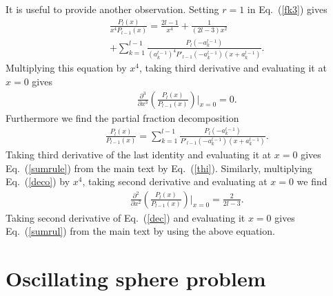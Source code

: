 \documentclass[aps,prx,twocolumn,amsmath,amssymb,amsfonts]{revtex4-2}
\begin{document}
{{\begin{appendices}
It is useful to provide another observation. Setting $r=1$ in Eq.~(\ref{fk3}) gives
\begin{eqnarray}&&
\frac{P_{l}(x)}{x^{4} P_{l-1}(x)}\!=\!\frac{2l\!-\!1}{x^4}\!+\!\frac{1}{(2l-3)x^2}\nonumber\\&&
+\sum_{k=1}^{l-1}\frac{P_{l}(-a_k^{l-1})}{\left(a_k^{l-1}\right)^4P'_{l-1}(-a_k^{l-1})\left(x\!+\!a_k^{l-1}\right)}. \label{deco}
\end{eqnarray}
Multiplying this equation by $x^4$, taking third derivative and evaluating it at $x=0$ gives
\begin{eqnarray}&&
\frac{\partial^3}{\partial x^3}\left(\frac{P_{l}(x)}{P_{l-1}(x)}\right)|_{x=0}\!=\!0. \label{thi}
\end{eqnarray}
Furthermore we find the partial fraction decomposition
\begin{eqnarray}&&
\frac{P_{l}(x)}{P_{l-1}(x)}\!=\!\sum_{k=1}^{l-1}\frac{P_{l}(-a_k^{l-1})}{P'_{l-1}(-a_k^{l-1})\left(x\!+\!a_k^{l-1}\right)}.\label{dec}
\end{eqnarray}
Taking third derivative of the last identity and evaluating it at $x=0$ gives Eq.~(\ref{sumrule}) from the main text by Eq.~(\ref{thi}). Similarly, multiplying Eq.~(\ref{deco}) by $x^4$, taking second derivative and evaluating at $x=0$ we find
\begin{eqnarray}&&
\frac{\partial^2}{\partial x^2}\left(\frac{P_{l}(x)}{P_{l-1}(x)}\right)|_{x=0}\!=\!\frac{2}{2l-3}.
\end{eqnarray}
Taking second derivative of Eq.~(\ref{dec}) and evaluating it $x=0$ gives Eq.~(\ref{sumrul}) from the main text by using the above equation.




\section{Oscillating sphere problem}\label{tr}


\end{appendices}}}
\end{document}
